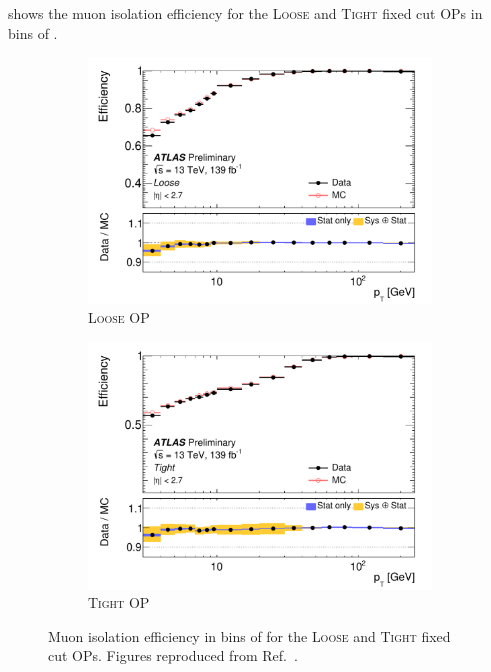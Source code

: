  shows the muon isolation efficiency for the \textsc{Loose} and \textsc{Tight} fixed cut OPs in bins of \pt.
\begin{figure}[htbp]
    \centering
    \begin{subfigure}{.49\textwidth}
      \centering
      \includegraphics[width=1.\textwidth]{figures/methods/muon_iso_loose.pdf}
      \caption{\textsc{Loose} OP}
      \label{fig:methods:event-reconstruction:muons:isolation:loose}
    \end{subfigure}
    \begin{subfigure}{.49\textwidth}
      \centering
      \includegraphics[width=1.\textwidth]{figures/methods/muon_iso_tight.pdf}
      \caption{\textsc{Tight} OP}
      \label{fig:methods:event-reconstruction:muons:isolation:tight}
    \end{subfigure}
    \caption{Muon isolation efficiency in bins of \pt for the \textsc{Loose} and \textsc{Tight} fixed cut OPs. Figures reproduced from Ref.~\cite{ATLAS-CONF-2020-030}.}
    \label{fig:methods:event-reconstruction:muons:isolation}
\end{figure}


